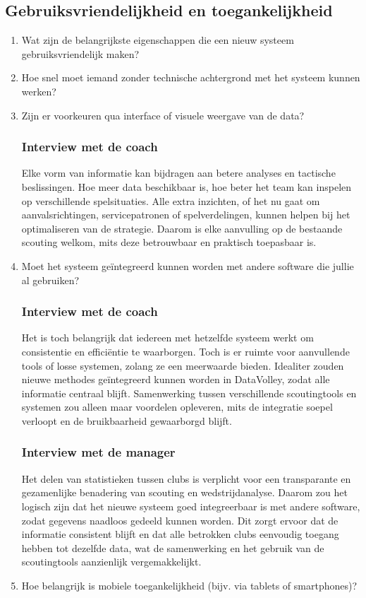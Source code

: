 \subsection{Gebruiksvriendelijkheid en toegankelijkheid}
\begin{enumerate}
  \item Wat zijn de belangrijkste eigenschappen die een nieuw systeem gebruiksvriendelijk maken?
  \item Hoe snel moet iemand zonder technische achtergrond met het systeem kunnen werken?
  \item Zijn er voorkeuren qua interface of visuele weergave van de data?
  \subsubsection{Interview met de coach}
  Elke vorm van informatie kan bijdragen aan betere analyses en tactische beslissingen. Hoe meer data beschikbaar is, hoe beter het team kan inspelen op verschillende spelsituaties. Alle extra inzichten, of het nu gaat om aanvalsrichtingen, servicepatronen of spelverdelingen, kunnen helpen bij het optimaliseren van de strategie. Daarom is elke aanvulling op de bestaande scouting welkom, mits deze betrouwbaar en praktisch toepasbaar is.
  \item Moet het systeem geïntegreerd kunnen worden met andere software die jullie al gebruiken?
  \subsubsection{Interview met de coach}
  Het is toch belangrijk dat iedereen met hetzelfde systeem werkt om consistentie en efficiëntie te waarborgen. Toch is er ruimte voor aanvullende tools of losse systemen, zolang ze een meerwaarde bieden. Idealiter zouden nieuwe methodes geïntegreerd kunnen worden in DataVolley, zodat alle informatie centraal blijft. Samenwerking tussen verschillende scoutingtools en systemen zou alleen maar voordelen opleveren, mits de integratie soepel verloopt en de bruikbaarheid gewaarborgd blijft.
  \subsubsection{Interview met de manager}
  Het delen van statistieken tussen clubs is verplicht voor een transparante en gezamenlijke benadering van scouting en wedstrijdanalyse. Daarom zou het logisch zijn dat het nieuwe systeem goed integreerbaar is met andere software, zodat gegevens naadloos gedeeld kunnen worden. Dit zorgt ervoor dat de informatie consistent blijft en dat alle betrokken clubs eenvoudig toegang hebben tot dezelfde data, wat de samenwerking en het gebruik van de scoutingtools aanzienlijk vergemakkelijkt.
  \item Hoe belangrijk is mobiele toegankelijkheid (bijv. via tablets of smartphones)?

\end{enumerate}
